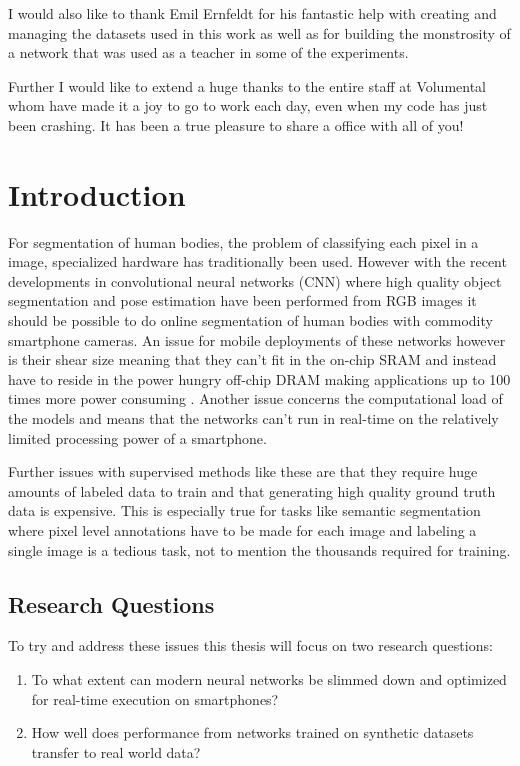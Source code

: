 \documentclass{kththesis}
\begin{document}
I would also like to thank Emil Ernfeldt for his fantastic help with creating and
managing the datasets used in this work as well as for building the monstrosity
of a network that was used as a teacher in some of the experiments.

Further I would like to extend a huge thanks to the entire staff at Volumental whom have made it a joy to go to work
each day, even when my code has just been crashing. It has been a true pleasure to share a office with all of you!


\tableofcontents


\mainmatter


\chapter{Introduction}

For segmentation of human bodies, the problem of classifying each pixel in a
image, specialized hardware has traditionally been used.
However with the recent developments in convolutional neural networks
(CNN) where high quality object segmentation \parencite{BriefHistory} and pose
estimation \parencite{he2017mask} have been performed from RGB images it should
be possible to do online segmentation of human bodies with commodity smartphone cameras. An issue
for mobile deployments of these networks however is their shear size meaning
that they can't fit in the on-chip SRAM and instead have to reside in the power
hungry off-chip DRAM making applications up to 100 times more power consuming
\parencite{han2015learning}. Another issue concerns the computational load of
the models and means that the networks can't run in real-time on the relatively
limited processing power of a smartphone. 

Further issues with supervised methods like these are that they require huge amounts of
labeled data to train and that generating high quality ground truth data is
expensive. This is especially true for tasks like semantic segmentation
where pixel level annotations have to be made for each image and labeling a
single image is a tedious task, not to mention the thousands required for
training. 

\section{Research Questions}
To try and address these issues this thesis will focus on two research questions:
\begin{enumerate}
\item To what extent can modern neural networks be slimmed down and optimized for
  real-time execution on smartphones?
\item How well does performance from networks trained on synthetic datasets
  transfer to real world data? 
\end{enumerate}
  
\end{document}
